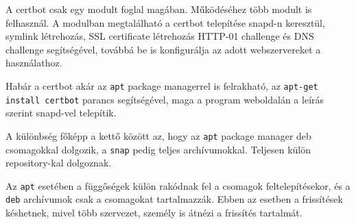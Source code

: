 
\pagebreak


A certbot csak egy modult foglal magában. Működéséhez több modult is felhasznál. A modulban megtalálható a certbot telepítése snapd-n keresztül, symlink létrehozás, SSL certificate létrehozás HTTP-01 challenge és DNS challenge segítségével, továbbá be is konfigurálja az adott webszervereket a használathoz.

Habár a certbot akár az \texttt{apt} package managerrel is felrakható, az \texttt{apt-get install certbot} parancs segítségével, maga a program weboldalán a leírás szerint snapd-vel telepítik. \cite{certbot_install_debian}

A különbség főképp a kettő között az, hogy az \texttt{apt} package manager deb csomagokkal dolgozik, a \texttt{snap} pedig teljes archívumokkal. Teljesen külön repository-kal dolgoznak.

Az \texttt{apt} esetében a függőségek külön rakódnak fel a csomagok feltelepítésekor, és a \texttt{deb} archívumok csak a csomagokat tartalmazzák. Ebben az esetben a frissítések késhetnek, mivel több szervezet, személy is átnézi a frissítés tartalmát.

